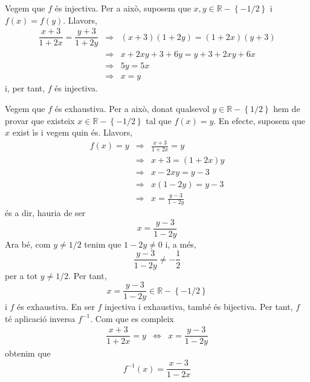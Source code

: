 \begin{solucio}
Vegem que $f$ \'{e}s injectiva. Per a aix\`{o}, suposem que $x,y\in \mathbb{R%
}-\left\{ -1/2\right\} $ i $f(x)=f(y)$. Llavors,%
\begin{equation*}
\begin{array}{lll}
\dfrac{x+3}{1+2x}=\dfrac{y+3}{1+2y} & \Longrightarrow &
(x+3)(1+2y)=(1+2x)(y+3) \\
& \Longrightarrow & x+2xy+3+6y=y+3+2xy+6x \\
& \Longrightarrow & 5y=5x \\
& \Longrightarrow & x=y%
\end{array}%
\end{equation*}%
i, per tant, $f$ \'{e}s injectiva.

Vegem que $f$ \'{e}s exhaustiva. Per a aix\`{o}, donat qualsevol $y\in
\mathbb{R}-\left\{ 1/2\right\} $ hem de provar que existeix $x\in \mathbb{R}%
-\left\{ -1/2\right\} $ tal que $f(x)=y$. En efecte, suposem que $x$ exist%
\'{\i}s i vegem quin \'{e}s. Llavors,%
\begin{equation*}
\begin{array}{lll}
f(x)=y & \Longrightarrow & \frac{x+3}{1+2x}=y \\
& \Longrightarrow & x+3=(1+2x)y \\
& \Longrightarrow & x-2xy=y-3 \\
& \Longrightarrow & x(1-2y)=y-3 \\
& \Longrightarrow & x=\frac{y-3}{1-2y}%
\end{array}%
\end{equation*}%
\'{e}s a dir, hauria de ser
\begin{equation*}
x=\frac{y-3}{1-2y}
\end{equation*}%
Ara b\'{e}, com $y\neq 1/2$ tenim que $1-2y\neq 0$ i, a m\'{e}s,
\begin{equation*}
\frac{y-3}{1-2y}\neq -\frac{1}{2}
\end{equation*}%
per a tot $y\neq 1/2$. Per tant,%
\begin{equation*}
x=\frac{y-3}{1-2y}\in \mathbb{R}-\left\{ -1/2\right\}
\end{equation*}%
i $f$ \'{e}s exhaustiva. En ser $f$ injectiva i exhaustiva, tamb\'{e} \'{e}s
bijectiva. Per tant, $f$ t\'{e} aplicaci\'{o} inversa $f^{-1}$. Com que es
compleix%
\begin{equation*}
\begin{array}{ccc}
\dfrac{x+3}{1+2x}=y & \Longleftrightarrow & x=\dfrac{y-3}{1-2y}%
\end{array}%
\end{equation*}%
obtenim que%
\begin{equation*}
f^{-1}(x)=\frac{x-3}{1-2x}
\end{equation*}
\end{solucio}

